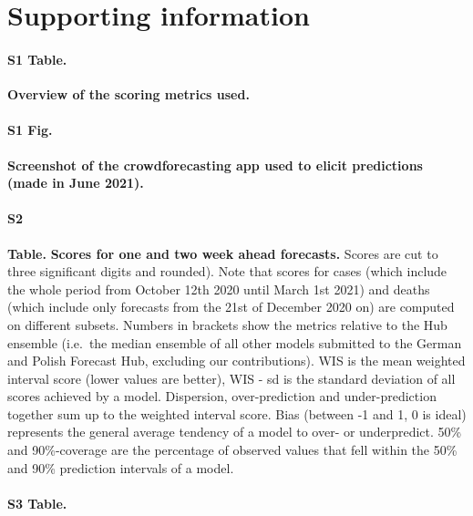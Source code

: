 \documentclass[10pt,letterpaper]{article}
\renewcommand{\figurename}{Fig}
\newcommand{\beginsupplement}{\setcounter{table}{0}  \renewcommand{\thetable}{S\arabic{table}}
\newfloat{text}{thp}{}
\floatname{text}{Text}
\renewcommand{\figurename}{}
\newcommand{\newfigurename}{Hello}
\setcounter{figure}{0} \renewcommand{\thefigure}{S\arabic{figure}}}
\begin{document}
\clearpage

\beginsupplement

\section*{Supporting information}

\paragraph*{S1 Table.}
\label{tab:scoring-metrics}

\textbf{Overview of the scoring metrics used.}

\paragraph*{S1 Fig.}
\label{fig:screenshot}

\textbf{Screenshot of the crowdforecasting app used to elicit predictions (made in June 2021).}

\paragraph*{S2}

\textbf{Table.} \label{tab:score-table-2}
\textbf{Scores for one and two week ahead forecasts.} Scores are cut to
three significant digits and rounded). Note that scores for cases (which
include the whole period from October 12th 2020 until March 1st 2021)
and deaths (which include only forecasts from the 21st of December 2020
on) are computed on different subsets. Numbers in brackets show the
metrics relative to the Hub ensemble (i.e.~the median ensemble of all
other models submitted to the German and Polish Forecast Hub, excluding
our contributions). WIS is the mean weighted interval score (lower
values are better), WIS - sd is the standard deviation of all scores
achieved by a model. Dispersion, over-prediction and under-prediction
together sum up to the weighted interval score. Bias (between -1 and 1,
0 is ideal) represents the general average tendency of a model to over-
or underpredict. 50\% and 90\%-coverage are the percentage of observed
values that fell within the 50\% and 90\% prediction intervals of a
model.

\paragraph*{S3 Table.}
\label{tab:score-table-4}
\end{document}
